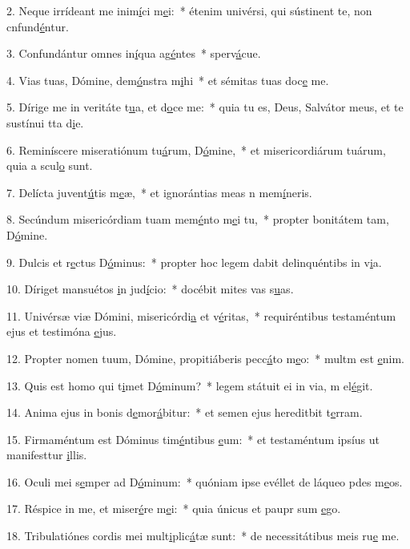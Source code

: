 2. Neque irrídeant me inim\uline{í}ci m\uline{e}i:~* étenim univérsi, qui sústinent te, non cnfund\uline{é}ntur.\par 
3. Confundántur omnes in\uline{í}qua ag\uline{é}ntes~* sperv\uline{á}cue.\par 
4. Vias tuas, Dómine, dem\uline{ó}nstra m\uline{i}hi~* et sémitas tuas doc\uline{e} me.\par 
5. Dírige me in veritáte t\uline{u}a, et d\uline{o}ce me:~* quia tu es, Deus, Salvátor meus, et te sustínui tta d\uline{i}e.\par 
6. Reminíscere miseratiónum tu\uline{á}rum, D\uline{ó}mine,~* et misericordiárum tuárum, quia a scul\uline{o} sunt.\par 
7. Delícta juvent\uline{ú}tis m\uline{e}æ,~* et ignorántias meas n mem\uline{í}neris.\par 
8. Secúndum misericórdiam tuam mem\uline{é}nto m\uline{e}i tu,~* propter bonitátem tam, D\uline{ó}mine.\par 
9. Dulcis et r\uline{e}ctus D\uline{ó}minus:~* propter hoc legem dabit delinquéntibs in v\uline{i}a.\par 
10. Díriget mansuétos \uline{i}n jud\uline{í}cio:~* docébit mites vas s\uline{u}as.\par 
11. Univérsæ viæ Dómini, misericórdi\uline{a} et v\uline{é}ritas,~* requiréntibus testaméntum ejus et testimóna \uline{e}jus.\par 
12. Propter nomen tuum, Dómine, propitiáberis pecc\uline{á}to m\uline{e}o:~* multm est \uline{e}nim.\par 
13. Quis est homo qui t\uline{i}met D\uline{ó}minum?~* legem státuit ei in via, m el\uline{é}git.\par 
14. Anima ejus in bonis d\uline{e}mor\uline{á}bitur:~* et semen ejus hereditbit t\uline{e}rram.\par 
15. Firmaméntum est Dóminus tim\uline{é}ntibus \uline{e}um:~* et testaméntum ipsíus ut manifesttur \uline{i}llis.\par 
16. Oculi mei s\uline{e}mper ad D\uline{ó}minum:~* quóniam ipse evéllet de láqueo pdes m\uline{e}os.\par 
17. Réspice in me, et miser\uline{é}re m\uline{e}i:~* quia únicus et paupr sum \uline{e}go.\par 
18. Tribulatiónes cordis mei mult\uline{i}plic\uline{á}tæ sunt:~* de necessitátibus meis ru\uline{e} me.\par 

